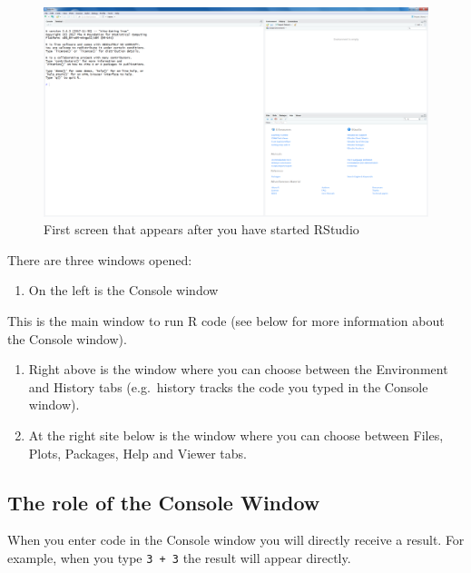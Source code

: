 \documentclass[]{book}
\providecommand{\tightlist}{%
  \setlength{\itemsep}{0pt}\setlength{\parskip}{0pt}}
\theoremstyle{definition}
\theoremstyle{definition}
\theoremstyle{definition}
\theoremstyle{remark}
\begin{document}
\begin{figure}

{\centering \includegraphics[width=0.9\linewidth]{images/fig1.10} 

}

\caption{First screen that appears after you have started RStudio}\label{fig:fig10}
\end{figure}

There are three windows opened:

\begin{enumerate}
\def\labelenumi{\arabic{enumi}.}
\tightlist
\item
  On the left is the Console window
\end{enumerate}

This is the main window to run R code (see below for more information
about the Console window).

\begin{enumerate}
\def\labelenumi{\arabic{enumi}.}
\setcounter{enumi}{1}
\item
  Right above is the window where you can choose between the Environment
  and History tabs (e.g.~history tracks the code you typed in the
  Console window).
\item
  At the right site below is the window where you can choose between
  Files, Plots, Packages, Help and Viewer tabs.
\end{enumerate}

\subsection{The role of the Console
Window}\label{the-role-of-the-console-window}

When you enter code in the Console window you will directly receive a
result. For example, when you type \texttt{3\ +\ 3} the result will
appear directly.
\end{document}
